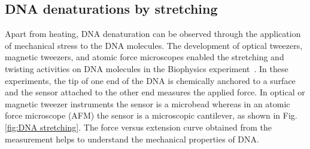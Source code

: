 \documentclass[12pt,masters,final]{UTRGVthesis}
\begin{document}
\subsection{DNA denaturations by stretching}
Apart from heating, DNA denaturation can be observed through the application of mechanical stress to the DNA molecules. The development of optical tweezers, magnetic tweezers, and atomic force microscopes enabled the stretching and twisting activities on DNA molecules  in the Biophysics experiment~\cite{Strick:2003}. In these experiments, the tip of one end of the DNA is chemically anchored to a surface and the sensor attached to the other end measures the applied force. In optical or magnetic tweezer instruments the sensor is a microbead whereas in an atomic force microscope (AFM) the sensor is a microscopic cantilever, as shown in Fig.\ref{fig:DNA stretching}. The force versus extension curve obtained from the measurement helps to understand the mechanical properties of DNA.\\ 
\end{document}

